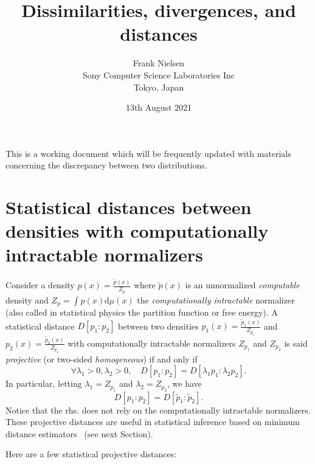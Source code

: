 \documentclass[11pt]{article}
\title{Dissimilarities, divergences, and distances}
\date{13th August 2021}
\author{Frank Nielsen\\ Sony Computer Science Laboratories Inc\\ Tokyo, Japan}
\def\dmu{\mathrm{d}\mu}
\begin{document}
\maketitle

This is a working document which will be frequently updated with materials concerning the discrepancy between two distributions.

\section{Statistical distances between densities with computationally intractable normalizers}

Consider a density $p(x)=\frac{\tilde p(x)}{Z_p}$ where $\tilde p(x)$ is an unnormalized {\em computable} density 
and $Z_p=\int p(x) \dmu(x)$ the {\em computationally intractable} normalizer (also called in statistical physics the partition function or free energy).
A statistical distance $D[p_1:p_2]$ between two densities $p_1(x)=\frac{\tilde p_1(x)}{Z_{p_1}}$ and $p_2(x)=\frac{\tilde p_2(x)}{Z_{p_2}}$ with computationally intractable normalizers $Z_{p_1}$ and $Z_{p_2}$ is said {\em projective} (or two-sided {\em homogeneous}) if and only if
$$
\forall \lambda_1>0,\lambda_2>0,\quad D[p_1:p_2]=D[\lambda_1p_1:\lambda_2 p_2].
$$
In particular, letting $\lambda_1=Z_{p_1}$ and $\lambda_2=Z_{p_2}$, we have
$$
D[p_1:p_2]=D[\tilde{p}_1:\tilde{p}_2].
$$
Notice that the rhs. does not rely on the computationally intractable normalizers.
These projective distances are useful in statistical inference based on minimum distance estimators~\cite{MinDistance-2019} (see next Section).


Here are a few statistical projective distances:
\end{document}

